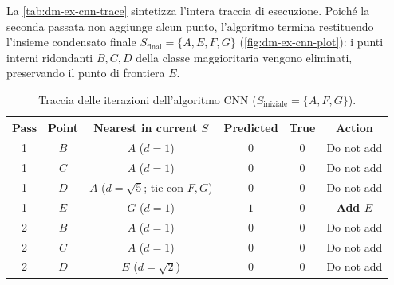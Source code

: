 La \autoref{tab:dm-ex-cnn-trace} sintetizza l'intera traccia di esecuzione. Poich\'e la seconda passata non aggiunge alcun punto, l'algoritmo termina restituendo l'insieme condensato finale $S_{\text{final}} = \{A, E, F, G\}$ (\autoref{fig:dm-ex-cnn-plot}): i punti interni ridondanti $B, C, D$ della classe maggioritaria vengono eliminati, preservando il punto di frontiera $E$.

\begin{table}[H]
\centering
\caption{Traccia delle iterazioni dell'algoritmo CNN ($S_{\text{iniziale}} = \{A, F, G\}$).}
\label{tab:dm-ex-cnn-trace}
\small
\begin{tabular}{cccccc}
\toprule
\textbf{Pass} & \textbf{Point} & \textbf{Nearest in current $S$} & \textbf{Predicted} & \textbf{True} & \textbf{Action} \\
\midrule
1 & $B$ & $A$ ($d=1$) & $0$ & $0$ & Do not add \\
1 & $C$ & $A$ ($d=1$) & $0$ & $0$ & Do not add \\
1 & $D$ & $A$ ($d=\sqrt{5}$; tie con $F, G$) & $0$ & $0$ & Do not add \\
1 & $E$ & $G$ ($d=1$) & $1$ & $0$ & \textbf{Add $E$} \\
2 & $B$ & $A$ ($d=1$) & $0$ & $0$ & Do not add \\
2 & $C$ & $A$ ($d=1$) & $0$ & $0$ & Do not add \\
2 & $D$ & $E$ ($d=\sqrt{2}$) & $0$ & $0$ & Do not add \\
\bottomrule
\end{tabular}
\end{table}

